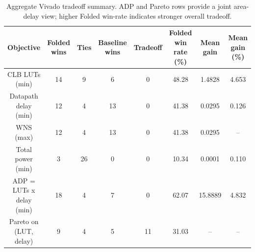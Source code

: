 \begin{table}[t]
\centering
\scriptsize
\setlength{\tabcolsep}{3.6pt}
\renewcommand{\arraystretch}{1.05}
\caption{Aggregate Vivado tradeoff summary. ADP and Pareto rows provide a joint area-delay view; higher Folded win-rate indicates stronger overall tradeoff.}
\label{tab:vivado_aggregate_wins}
\begin{tabular}{cccccccc}
\hline
Objective & Folded wins & Ties & Baseline wins & Tradeoff & Folded win rate (\%) & Mean gain & Mean gain (\%) \\
\hline
CLB LUTs (min) & 14 & 9 & 6 & 0 & 48.28 & 1.4828 & 4.653 \\
Datapath delay (min) & 12 & 4 & 13 & 0 & 41.38 & 0.0295 & 0.126 \\
WNS (max) & 12 & 4 & 13 & 0 & 41.38 & 0.0295 & -- \\
Total power (min) & 3 & 26 & 0 & 0 & 10.34 & 0.0001 & 0.110 \\
ADP = LUTs x delay (min) & 18 & 4 & 7 & 0 & 62.07 & 15.8889 & 4.832 \\
Pareto on (LUT, delay) & 9 & 4 & 5 & 11 & 31.03 & -- & -- \\
\hline
\end{tabular}
\end{table}
